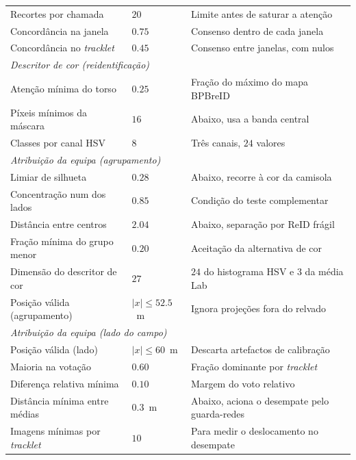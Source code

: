 \begin{table}[htbp]
\begin{tabular}{lll}
        Recortes por chamada         & $20$            & Limite antes de saturar a atenção \\
        Concordância na janela       & $0.75$          & Consenso dentro de cada janela \\
        Concordância no \emph{tracklet} & $0.45$       & Consenso entre janelas, com nulos \\
        \hline
        \multicolumn{3}{l}{\emph{Descritor de cor (reidentificação)}} \\
        Atenção mínima do torso      & $0.25$          & Fração do máximo do mapa BPBreID \\
        Píxeis mínimos da máscara    & $16$            & Abaixo, usa a banda central \\
        Classes por canal HSV        & $8$             & Três canais, $24$ valores \\
        \hline
        \multicolumn{3}{l}{\emph{Atribuição da equipa (agrupamento)}} \\
        Limiar de silhueta           & $0.28$          & Abaixo, recorre à cor da camisola \\
        Concentração num dos lados   & $0.85$          & Condição do teste complementar \\
        Distância entre centros      & $2.04$          & Abaixo, separação por ReID frágil \\
        Fração mínima do grupo menor & $0.20$          & Aceitação da alternativa de cor \\
        Dimensão do descritor de cor & $27$            & $24$ do histograma HSV e $3$ da média Lab \\
        Posição válida (agrupamento) & $|x| \le 52.5$~m & Ignora projeções fora do relvado \\
        \hline
        \multicolumn{3}{l}{\emph{Atribuição da equipa (lado do campo)}} \\
        Posição válida (lado)        & $|x| \le 60$~m   & Descarta artefactos de calibração \\
        Maioria na votação           & $0.60$          & Fração dominante por \emph{tracklet} \\
        Diferença relativa mínima    & $0.10$          & Margem do voto relativo \\
        Distância mínima entre médias & $0.3$~m        & Abaixo, aciona o desempate pelo guarda-redes \\
        Imagens mínimas por \emph{tracklet} & $10$    & Para medir o deslocamento no desempate \\
        \hline
    \end{tabular}
\end{table}


